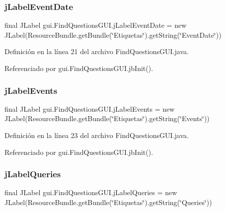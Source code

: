 \subsubsection{\texorpdfstring{jLabelEventDate}{jLabelEventDate}}
{\footnotesize\ttfamily final J\+Label gui.\+Find\+Questions\+G\+U\+I.\+j\+Label\+Event\+Date = new J\+Label(Resource\+Bundle.\+get\+Bundle(\char`\"{}Etiquetas\char`\"{}).get\+String(\char`\"{}Event\+Date\char`\"{}))\hspace{0.3cm}{\ttfamily [private]}}



Definición en la línea 21 del archivo Find\+Questions\+G\+U\+I.\+java.



Referenciado por gui.\+Find\+Questions\+G\+U\+I.\+jb\+Init().

\mbox{\label{classgui_1_1FindQuestionsGUI_a44489404c630d443ef23d756a0a59ddd}} 
\subsubsection{\texorpdfstring{jLabelEvents}{jLabelEvents}}
{\footnotesize\ttfamily final J\+Label gui.\+Find\+Questions\+G\+U\+I.\+j\+Label\+Events = new J\+Label(Resource\+Bundle.\+get\+Bundle(\char`\"{}Etiquetas\char`\"{}).get\+String(\char`\"{}Events\char`\"{}))\hspace{0.3cm}{\ttfamily [private]}}



Definición en la línea 23 del archivo Find\+Questions\+G\+U\+I.\+java.



Referenciado por gui.\+Find\+Questions\+G\+U\+I.\+jb\+Init().

\mbox{\label{classgui_1_1FindQuestionsGUI_a7e0f66edb87cb23a1ed731a4cbbf6679}} 
\subsubsection{\texorpdfstring{jLabelQueries}{jLabelQueries}}
{\footnotesize\ttfamily final J\+Label gui.\+Find\+Questions\+G\+U\+I.\+j\+Label\+Queries = new J\+Label(Resource\+Bundle.\+get\+Bundle(\char`\"{}Etiquetas\char`\"{}).get\+String(\char`\"{}Queries\char`\"{}))\hspace{0.3cm}{\ttfamily [private]}}



